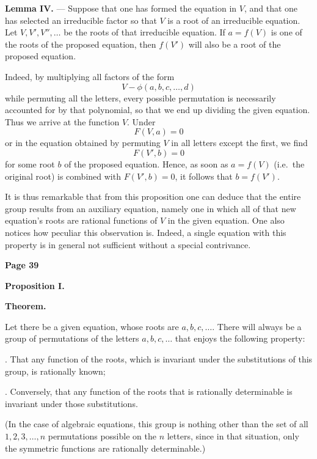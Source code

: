 \documentclass{article}
\begin{document}
\medskip

\noindent
\textbf{Lemma IV.} --- Suppose that one has formed the equation in \(V\), and that one has selected an irreducible factor so that \(V\) is a root of an irreducible equation. Let \(V, V', V'', \dots\) be the roots of that irreducible equation. If \(a = f(V)\) is one of the roots of the proposed equation, then \(f(V')\) will also be a root of the proposed equation.

\smallskip

\noindent
Indeed, by multiplying all factors of the form
\[
V - \phi(a, b, c, \dots, d)
\]
while permuting all the letters, every possible permutation is necessarily accounted for by that polynomial, so that we end up dividing the given equation. Thus we arrive at the function \(V\). Under
\[
F(V, a) = 0
\]
or in the equation obtained by permuting \(V\) in all letters except the first, we find
\[
F(V', b) = 0
\]
for some root \(b\) of the proposed equation. Hence, as soon as \(a = f(V)\) (i.e.\ the original root) is combined with \(F(V', b) = 0\), it follows that \(b = f(V')\).

\smallskip

\noindent
It is thus remarkable that from this proposition one can deduce that the entire group results from an auxiliary equation, namely one in which all of that new equation's roots are rational functions of \(V\) in the given equation. One also notices how peculiar this observation is. Indeed, a single equation with this property is in general not sufficient without a special contrivance.


\newpage
\noindent
\textbf{Page 39}

\noindent
\textbf{Proposition I.}

\smallskip


\noindent
\textbf{Theorem.} {Let there be a given equation, whose roots are \(a, b, c, \dots\). There will always be a group of permutations of the letters \(a, b, c, \dots\) that enjoys the following property:

\smallskip

. That any function of the roots, which is invariant under the substitutions of this group, is rationally known;

. Conversely, that any function of the roots that is rationally determinable is invariant under those substitutions.}

\smallskip

\noindent
(In the case of algebraic equations, this group is nothing other than the set of all \(1, 2, 3, \dots, n\) permutations possible on the \(n\) letters, since in that situation, only the symmetric functions are rationally determinable.)
\end{document}
